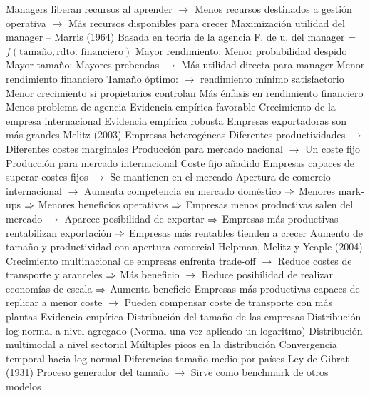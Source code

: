\documentclass{nuevotema}
\begin{document}
\begin{esquemal}
				\4[] Managers liberan recursos al aprender
				\4[] $\to$ Menos recursos destinados a gestión operativa
				\4[] $\to$ Más recursos disponibles para crecer
			\3 Maximización utilidad del manager -- Marris (1964)
				\4 Basada en teoría de la agencia
				\4[] F. de u. del manager = $f(\text{tamaño}, \text{rdto. financiero})$
				\4 Mayor rendimiento:
				\4[] Menor probabilidad despido
				\4 Mayor tamaño:
				\4[] Mayores prebendas
				\4[] $\to$ Más utilidad directa para manager
				\4[] Menor rendimiento financiero
				\4 Tamaño óptimo:
				\4[] $\to$ rendimiento mínimo satisfactorio
				\4 Menor crecimiento si propietarios controlan
				\4[] Más énfasis en rendimiento financiero
				\4[] Menos problema de agencia
				\4[] Evidencia empírica favorable
			\3 Crecimiento de la empresa internacional
				\4 Evidencia empírica robusta
				\4[] Empresas exportadoras son más grandes
				\4 Melitz (2003)
				\4[] Empresas heterogéneas
				\4[] Diferentes productividades
				\4[] $\to$ Diferentes costes marginales
				\4[] Producción para mercado nacional
				\4[] $\to$ Un coste fijo
				\4[] Producción para mercado internacional
				\4[] Coste fijo añadido
				\4[] Empresas capaces de superar costes fijos
				\4[] $\to$ Se mantienen en el mercado
				\4[] Apertura de comercio internacional
				\4[] $\to$ Aumenta competencia en mercado doméstico
				\4[] $\then$ Menores mark-ups
				\4[] $\then$ Menores beneficios operativos
				\4[] $\then$ Empresas menos productivas salen del mercado
				\4[] $\to$ Aparece posibilidad de exportar
				\4[] $\then$ Empresas más productivas rentabilizan exportación
				\4[] $\then$ Empresas más rentables tienden a crecer
				\4[$\then$] Aumento de tamaño y productividad con apertura comercial
				\4 Helpman, Melitz y Yeaple (2004)
				\4[] Crecimiento multinacional de empresas enfrenta trade-off
				\4[] $\to$ Reduce costes de transporte y aranceles
				\4[] $\then$ Más beneficio
				\4[] $\to$ Reduce posibilidad de realizar economías de escala
				\4[] $\then$ Aumenta beneficio
				\4[] Empresas más productivas capaces de replicar a menor coste
				\4[] $\to$ Pueden compensar coste de transporte con más plantas
		\2 Evidencia empírica
			\3 Distribución del tamaño de las empresas
				\4 Distribución log-normal a nivel agregado
				\4[] (Normal una vez aplicado un logaritmo)
				\4 Distribución multimodal a nivel sectorial
				\4[] Múltiples picos en la distribución
				\4 Convergencia temporal hacia log-normal
				\4 Diferencias tamaño medio por países
			\3 Ley de Gibrat (1931)
				\4 Proceso generador del tamaño
				\4[] $\to$ Sirve como benchmark de otros modelos

\end{esquemal}
\end{document}
